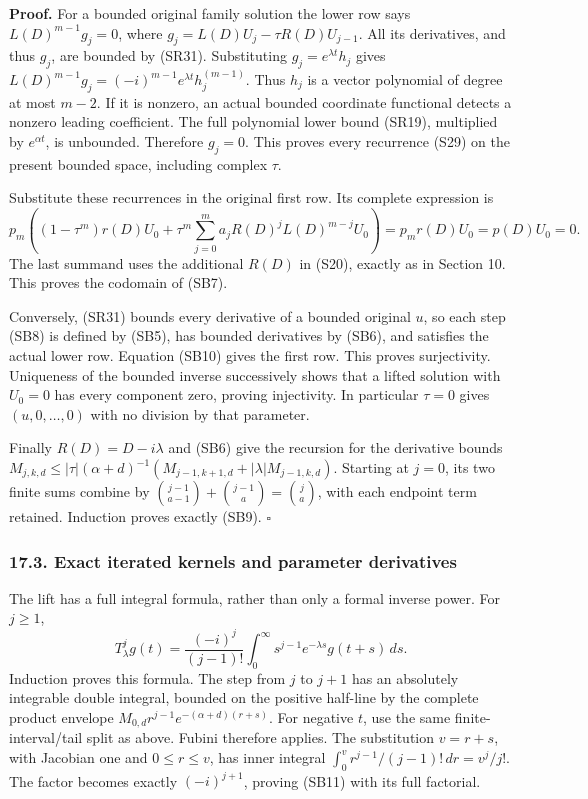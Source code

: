 \documentclass[
  11pt,
]{article}
\begin{document}
\textbf{Proof.} For a bounded original family solution the lower row
says \(L(D)^{m-1}g_j=0\), where \(g_j=L(D)U_j-\tau R(D)U_{j-1}\). All
its derivatives, and thus \(g_j\), are bounded by (SR31). Substituting
\(g_j=e^{\lambda t}h_j\) gives
\(L(D)^{m-1}g_j=(-i)^{m-1}e^{\lambda t}h_j^{(m-1)}\). Thus \(h_j\) is a
vector polynomial of degree at most \(m-2\). If it is nonzero, an actual
bounded coordinate functional detects a nonzero leading coefficient. The
full polynomial lower bound (SR19), multiplied by \(e^{\alpha t}\), is
unbounded. Therefore \(g_j=0\). This proves every recurrence (S29) on
the present bounded space, including complex \(\tau\).

Substitute these recurrences in the original first row. Its complete
expression is \[
 p_m\left((1-\tau^m)r(D)U_0+
       \tau^m\sum_{j=0}^ma_jR(D)^jL(D)^{m-j}U_0\right)
                  =p_mr(D)U_0=p(D)U_0=0.
 \tag{SB10}
\] The last summand uses the additional \(R(D)\) in (S20), exactly as in
Section 10. This proves the codomain of (SB7).

Conversely, (SR31) bounds every derivative of a bounded original \(u\),
so each step (SB8) is defined by (SB5), has bounded derivatives by
(SB6), and satisfies the actual lower row. Equation (SB10) gives the
first row. This proves surjectivity. Uniqueness of the bounded inverse
successively shows that a lifted solution with \(U_0=0\) has every
component zero, proving injectivity. In particular \(\tau=0\) gives
\((u,0,\ldots,0)\) with no division by that parameter.

Finally \(R(D)=D-i\lambda\) and (SB6) give the recursion for the
derivative bounds \(M_{j,k,d}\leq |\tau|(\alpha+d)^{-1}
 (M_{j-1,k+1,d}+|\lambda|M_{j-1,k,d})\). Starting at \(j=0\), its two
finite sums combine by \(\binom{j-1}{a-1}+\binom{j-1}a=\binom ja\), with
each endpoint term retained. Induction proves exactly (SB9). \(\square\)

\subsubsection{17.3. Exact iterated kernels and parameter
derivatives}\label{exact-iterated-kernels-and-parameter-derivatives}

The lift has a full integral formula, rather than only a formal inverse
power. For \(j\geq1\), \[
 T_\lambda^jg(t)=\frac{(-i)^j}{(j-1)!}
        \int_0^\infty s^{j-1}e^{-\lambda s}g(t+s)\,ds.
 \tag{SB11}
\] Induction proves this formula. The step from \(j\) to \(j+1\) has an
absolutely integrable double integral, bounded on the positive half-line
by the complete product envelope \(M_{0,d}r^{j-1}e^{-(\alpha+d)(r+s)}\).
For negative \(t\), use the same finite-interval/tail split as above.
Fubini therefore applies. The substitution \(v=r+s\), with Jacobian one
and \(0\leq r\leq v\), has inner integral
\(\int_0^v r^{j-1}/(j-1)!\,dr=v^j/j!\). The factor becomes exactly
\((-i)^{j+1}\), proving (SB11) with its full factorial.
\end{document}
